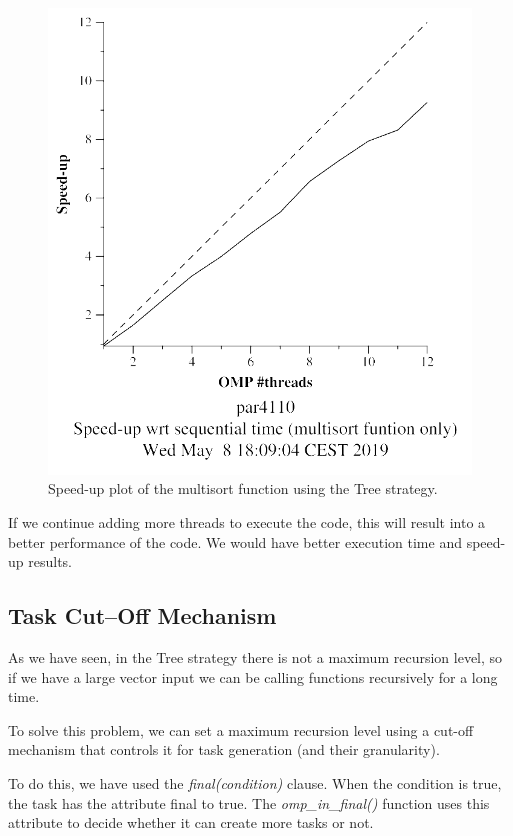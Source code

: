 \documentclass[12pt, a4paper]{article}
\begin{document}
\begin{figure}[H]
\begin{minipage}[b]{0.4\linewidth}
  \includegraphics[scale=0.5]{./S2/S2_strong_scalability/multisort-omp-strong_boada-3_tree_multisort_only}
  \caption{Speed-up plot of the multisort function using the Tree strategy.}
  \label{fig:mandel-omp-10000-strong-21-speedup}
\end{minipage}
\end{figure}

If we continue adding more threads to execute the code, this will result into a better performance of the code. We would have better execution time and speed-up results.

\subsection{Task Cut–Off Mechanism}

As we have seen, in the Tree strategy there is not a maximum recursion level, so if we have a large vector input we can be calling functions recursively for a long time.

To solve this problem, we can set a maximum recursion level using a cut-off mechanism that controls it for task generation (and their granularity).

To do this, we have used the \textit{final(condition)} clause. When the condition is true, the task has the attribute final to true. The \textit{omp\_in\_final()} function uses this attribute to decide whether it can create more tasks or not.
\end{document}
